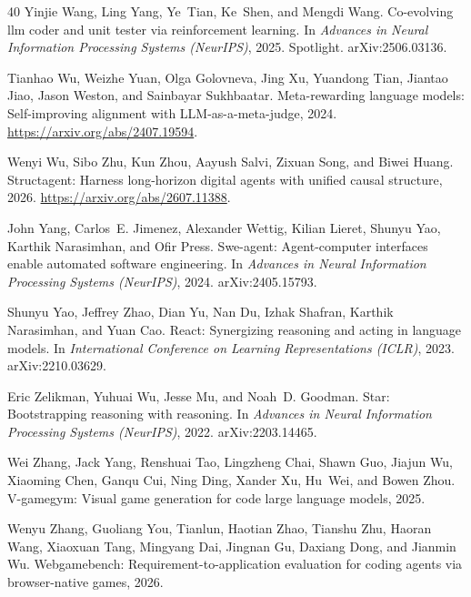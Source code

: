 \begin{thebibliography}{40}
Yinjie Wang, Ling Yang, Ye~Tian, Ke~Shen, and Mengdi Wang.
\newblock Co-evolving llm coder and unit tester via reinforcement learning.
\newblock In \emph{Advances in Neural Information Processing Systems (NeurIPS)}, 2025. Spotlight. arXiv:2506.03136.

Tianhao Wu, Weizhe Yuan, Olga Golovneva, Jing Xu, Yuandong Tian, Jiantao Jiao, Jason Weston, and Sainbayar Sukhbaatar.
\newblock Meta-rewarding language models: Self-improving alignment with LLM-as-a-meta-judge, 2024.
\newblock \url{https://arxiv.org/abs/2407.19594}.

Wenyi Wu, Sibo Zhu, Kun Zhou, Aayush Salvi, Zixuan Song, and Biwei Huang.
\newblock Structagent: Harness long-horizon digital agents with unified causal structure, 2026.
\newblock \url{https://arxiv.org/abs/2607.11388}.

John Yang, Carlos~E. Jimenez, Alexander Wettig, Kilian Lieret, Shunyu Yao, Karthik Narasimhan, and Ofir Press.
\newblock Swe-agent: Agent-computer interfaces enable automated software engineering.
\newblock In \emph{Advances in Neural Information Processing Systems (NeurIPS)}, 2024. arXiv:2405.15793.

Shunyu Yao, Jeffrey Zhao, Dian Yu, Nan Du, Izhak Shafran, Karthik Narasimhan, and Yuan Cao.
\newblock React: Synergizing reasoning and acting in language models.
\newblock In \emph{International Conference on Learning Representations (ICLR)}, 2023. arXiv:2210.03629.

Eric Zelikman, Yuhuai Wu, Jesse Mu, and Noah~D. Goodman.
\newblock Star: Bootstrapping reasoning with reasoning.
\newblock In \emph{Advances in Neural Information Processing Systems (NeurIPS)}, 2022. arXiv:2203.14465.

Wei Zhang, Jack Yang, Renshuai Tao, Lingzheng Chai, Shawn Guo, Jiajun Wu, Xiaoming Chen, Ganqu Cui, Ning Ding, Xander Xu, Hu~Wei, and Bowen Zhou.
\newblock V-gamegym: Visual game generation for code large language models, 2025.

Wenyu Zhang, Guoliang You, Tianlun, Haotian Zhao, Tianshu Zhu, Haoran Wang, Xiaoxuan Tang, Mingyang Dai, Jingnan Gu, Daxiang Dong, and Jianmin Wu.
\newblock Webgamebench: Requirement-to-application evaluation for coding agents via browser-native games, 2026.


\end{thebibliography}
